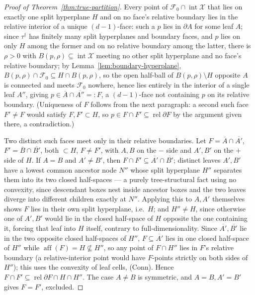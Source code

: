 \documentclass[11pt]{article}
\theoremstyle{plain}
\theoremstyle{definition}
\theoremstyle{remark}
\newcommand{\cX}{\mathcal{X}}
\newcommand{\cF}{\mathcal{F}}
\begin{document}
\begin{proof}[Proof of Theorem~\ref{thm:true-partition}]
Every point of \(\cF_0\cap\operatorname{int}\cX\) that lies on exactly one
split hyperplane \(H\) and on no face's relative boundary lies in the
relative interior of a unique \((d-1)\)-face: such a \(p\) lies in
\(\partial A\) for some leaf \(A\); since \(\tau^{\dagger}\) has finitely
many split hyperplanes and boundary faces, and \(p\) lies on only \(H\)
among the former and on no relative boundary among the latter, there is
\(\rho>0\) with \(B(p,\rho)\subseteq\operatorname{int}\cX\) meeting no other
split hyperplane and no face's relative boundary; by
Lemma~\ref{lem:boundary-hyperplane}, \(B(p,\rho)\cap\cF_0\subseteq
H\cap B(p,\rho)\), so the open half-ball of \(B(p,\rho)\setminus H\)
opposite \(A\) is connected and meets \(\cF_0\) nowhere, hence lies entirely
in the interior of a single leaf \(A''\), giving
\(p\in\overline A\cap\overline{A''}=:F\), a \((d-1)\)-face not containing
\(p\) on its relative boundary. (Uniqueness of \(F\) follows from the next
paragraph: a second such face \(F'\ne F\) would satisfy \(F,F'\subset H\),
so \(p\in F\cap F'\subseteq\operatorname{rel}\partial F\) by the argument
given there, a contradiction.)

Two distinct such faces meet only in their relative boundaries. Let
\(F=\overline A\cap\overline{A'}\), \(F'=\overline B\cap\overline{B'}\),
both \(\subset H\), \(F\ne F'\), with \(A,B\) on the \(-\) side and
\(A',B'\) on the \(+\) side of \(H\). If \(A=B\) and \(A'\ne B'\), then
\(F\cap F'\subseteq\overline{A'}\cap\overline{B'}\); distinct leaves
\(A',B'\) have a lowest common ancestor node \(N''\) whose split hyperplane
\(H''\) separates them into its two closed half-spaces --- a purely
tree-structural fact using no convexity, since descendant boxes nest inside
ancestor boxes and the two leaves diverge into different children exactly
at \(N''\). Applying this to \(A,A'\) themselves shows \(F\) lies in their
own split hyperplane, i.e.\ \(H\); and \(H''\ne H\), since otherwise one of
\(A',B'\) would lie in the closed half-space of \(H\) opposite the one
containing it, forcing that leaf into \(H\) itself, contrary to
full-dimensionality. Since \(\overline{A'},\overline{B'}\) lie in the two
opposite closed half-spaces of \(H''\), \(F\subseteq\overline{A'}\) lies in
one closed half-space of \(H''\) while \(\operatorname{aff}(F)=H\not\subseteq H''\),
so any point of \(F\cap H''\) lies in \(F\)'s relative boundary (a relative-interior
point would have \(F\)-points strictly on both sides of \(H''\)); this uses
the convexity of leaf cells, (Conn). Hence
\(F\cap F'\subseteq\operatorname{rel}\partial F\cap H\cap H''\). The case
\(A\ne B\) is symmetric, and \(A=B,A'=B'\) gives \(F=F'\), excluded.


\end{proof}
\end{document}
